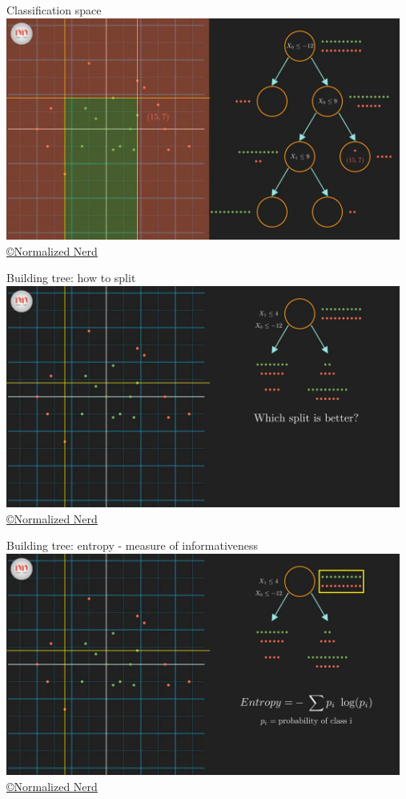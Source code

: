 \documentclass[handout, 10pt]{beamer}
\begin{document}
\begin{frame}{Classification space}
\hspace*{-1cm}\includegraphics[width=13cm]{dt/_4-22 screenshot}
{\tiny \href{https://www.youtube.com/watch?v=ZVR2Way4nwQ}{ \copyright Normalized Nerd}}
\end{frame}

\begin{frame}{Building tree: how to split}
\hspace*{-1cm}\includegraphics[width=13cm]{dt/_5-55 screenshot}
{\tiny \href{https://www.youtube.com/watch?v=ZVR2Way4nwQ}{ \copyright Normalized Nerd}}
\end{frame}

\begin{frame}{Building tree: entropy - measure of informativeness}
\hspace*{-1cm}\includegraphics[width=13cm]{dt/_7-2 screenshot}
{\tiny \href{https://www.youtube.com/watch?v=ZVR2Way4nwQ}{ \copyright Normalized Nerd}}
\end{frame}
\end{document}
